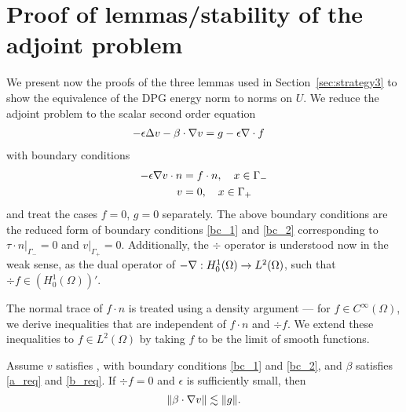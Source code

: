 \chapter{Proof of lemmas/stability of the adjoint problem}

We present now the proofs of the three lemmas used in Section~\ref{sec:strategy3} to show the equivalence of the DPG energy norm to norms on $U$. We reduce the adjoint problem to the scalar second order equation
\begin{align}
- \epsilon \Delta v - \beta \cdot \grad v &= g - \epsilon \div f \eqnlab{adjoint}
\end{align}
with boundary conditions
\begin{align}
- \epsilon \grad v \cdot n &=f\cdot n, \quad x\in \Gamma_- \label{reducedbc_1}\\ 
v &= 0, \quad x\in \Gamma_+ \label{reducedbc_2}
\end{align}
and treat the cases $f=0$, $g=0$ separately.  The above boundary conditions are the reduced form of boundary conditions \eqref{bc_1} and \eqref{bc_2} corresponding to $\left.\tau\cdot n\right|_{\Gamma_-}=0$ and $\left.v\right|_{\Gamma_+}=0$. Additionally, the $\div$ operator is understood now in the weak sense, as the dual operator of $-\grad : H_0^1(\Omega) \rightarrow L^2(\Omega)$, such that $\div f \in \left(H_0^1(\Omega)\right)'$. 

The normal trace of $f\cdot n$ is treated using a density argument --- for $f\in C^\infty(\Omega)$, we derive inequalities that are independent of $f\cdot n$ and $\div f$. We extend these inequalities to $f\in L^2(\Omega)$ by taking $f$ to be the limit of smooth functions. 

\begin{lemma} 
\label{lemma_stream}
Assume $v$ satisfies , with boundary conditions \eqref{bc_1} and \eqref{bc_2}, and $\beta$ satisfies \eqref{a_req} and \eqref{b_req}.  If $\div f = 0$ and $\epsilon$ is sufficiently small, then
\[
\|\beta \cdot \grad v \| \lesssim \| g\|.
\]
\end{lemma}

